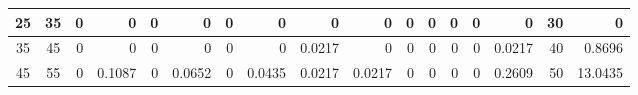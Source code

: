 \begin{table}[ht]
\begin{adjustbox}{width = \textwidth, center}
\begin{tabular}{|cc|r|r|r|r|r|r|r|r|r|r|r|r|r|r|r|}
            \cellcolor[HTML]{C9DAF8}\hspace{6pt}25\hspace{6pt}             & \cellcolor[HTML]{EBF1FC}35             & 0                                              & 0                                              & 0                                              & 0                                              & 0                                              & 0                                              & 0                                              & 0                                               & 0                                               & 0                                               & 0                                               & 0                                               & \cellcolor[HTML]{D9D2E9}0                                                       & \cellcolor[HTML]{D9D2E9}30                                              & \cellcolor[HTML]{D9D2E9}0                                                                        \\ \hline
            \rowcolor[HTML]{FFFFFF} 
            \cellcolor[HTML]{C9DAF8}35             & \cellcolor[HTML]{EBF1FC}45             & 0                                              & 0                                              & 0                                              & 0                                              & 0                                              & 0                                              & \cellcolor[HTML]{DEF2E8}0.0217                 & 0                                               & 0                                               & 0                                               & 0                                               & 0                                               & \cellcolor[HTML]{D9D2E9}0.0217                                                  & \cellcolor[HTML]{D9D2E9}40                                              & \cellcolor[HTML]{D9D2E9}0.8696                                                                   \\ \hline
            \cellcolor[HTML]{C9DAF8}45             & \cellcolor[HTML]{EBF1FC}55             & \cellcolor[HTML]{FFFFFF}0                      & \cellcolor[HTML]{57BB8A}0.1087                 & \cellcolor[HTML]{FFFFFF}0                      & \cellcolor[HTML]{9BD7B9}0.0652                 & \cellcolor[HTML]{FFFFFF}0                      & \cellcolor[HTML]{BCE4D1}0.0435                 & \cellcolor[HTML]{DEF2E8}0.0217                 & \cellcolor[HTML]{DEF2E8}0.0217                  & \cellcolor[HTML]{FFFFFF}0                       & \cellcolor[HTML]{FFFFFF}0                       & \cellcolor[HTML]{FFFFFF}0                       & \cellcolor[HTML]{FFFFFF}0                       & \cellcolor[HTML]{D9D2E9}0.2609                                                  & \cellcolor[HTML]{D9D2E9}50                                              & \cellcolor[HTML]{D9D2E9}13.0435                                                                  \\ \hline

\end{tabular}
\end{adjustbox}
\end{table}

